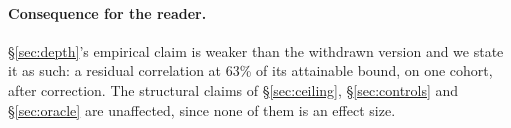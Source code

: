 \paragraph{Consequence for the reader.} \S\ref{sec:depth}'s empirical claim is
weaker than the withdrawn version and we state it as such: a residual
correlation at 63\% of its attainable bound, on one cohort, after correction. The
structural claims of \S\ref{sec:ceiling}, \S\ref{sec:controls} and
\S\ref{sec:oracle} are unaffected, since none of them is an effect size.
